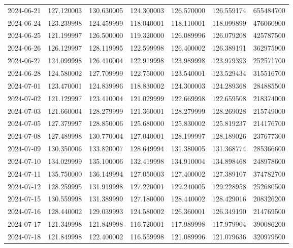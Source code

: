 \begin{tabular}{lrrrrrr}
2024-06-21 &  127.120003 &  130.630005 &  124.300003 &  126.570000 &  126.559174 &   655484700 \\
2024-06-24 &  123.239998 &  124.459999 &  118.040001 &  118.110001 &  118.099899 &   476060900 \\
2024-06-25 &  121.199997 &  126.500000 &  119.320000 &  126.089996 &  126.079208 &   425787500 \\
2024-06-26 &  126.129997 &  128.119995 &  122.599998 &  126.400002 &  126.389191 &   362975900 \\
2024-06-27 &  124.099998 &  126.410004 &  122.919998 &  123.989998 &  123.979393 &   252571700 \\
2024-06-28 &  124.580002 &  127.709999 &  122.750000 &  123.540001 &  123.529434 &   315516700 \\
2024-07-01 &  123.470001 &  124.839996 &  118.830002 &  124.300003 &  124.289368 &   284885500 \\
2024-07-02 &  121.129997 &  123.410004 &  121.029999 &  122.669998 &  122.659508 &   218374000 \\
2024-07-03 &  121.660004 &  128.279999 &  121.360001 &  128.279999 &  128.269028 &   215749000 \\
2024-07-05 &  127.379997 &  128.850006 &  125.680000 &  125.830002 &  125.819237 &   214176700 \\
2024-07-08 &  127.489998 &  130.770004 &  127.040001 &  128.199997 &  128.189026 &   237677300 \\
2024-07-09 &  130.350006 &  133.820007 &  128.649994 &  131.380005 &  131.368774 &   285366600 \\
2024-07-10 &  134.029999 &  135.100006 &  132.419998 &  134.910004 &  134.898468 &   248978600 \\
2024-07-11 &  135.750000 &  136.149994 &  127.050003 &  127.400002 &  127.389107 &   374782700 \\
2024-07-12 &  128.259995 &  131.919998 &  127.220001 &  129.240005 &  129.228958 &   252680500 \\
2024-07-15 &  130.559998 &  131.389999 &  127.180000 &  128.440002 &  128.429016 &   208326200 \\
2024-07-16 &  128.440002 &  129.039993 &  124.580002 &  126.360001 &  126.349190 &   214769500 \\
2024-07-17 &  121.349998 &  121.849998 &  116.720001 &  117.989998 &  117.979904 &   390086200 \\
2024-07-18 &  121.849998 &  122.400002 &  116.559998 &  121.089996 &  121.079636 &   320979500 \\

\end{tabular}
